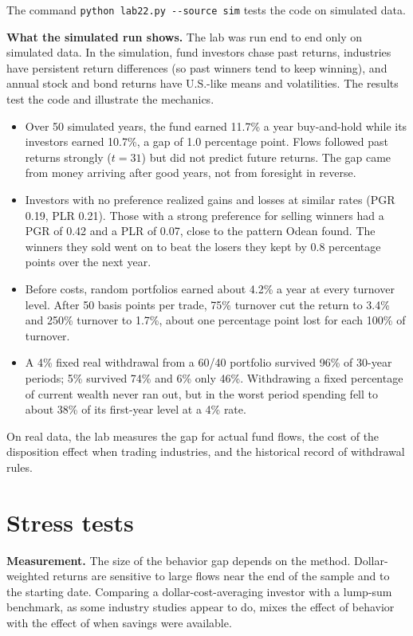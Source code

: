 The command \texttt{python lab22.py -{}-source sim} tests the code on simulated data.

\textbf{What the simulated run shows.} The lab was run end to end only on simulated data. In the simulation, fund investors chase past returns, industries have persistent return differences (so past winners tend to keep winning), and annual stock and bond returns have U.S.-like means and volatilities. The results test the code and illustrate the mechanics.

\begin{itemize}
  \item Over 50 simulated years, the fund earned 11.7\% a year buy-and-hold while its investors earned 10.7\%, a gap of 1.0 percentage point. Flows followed past returns strongly ($t = 31$) but did not predict future returns. The gap came from money arriving after good years, not from foresight in reverse.
  \item Investors with no preference realized gains and losses at similar rates (PGR 0.19, PLR 0.21). Those with a strong preference for selling winners had a PGR of 0.42 and a PLR of 0.07, close to the pattern Odean found. The winners they sold went on to beat the losers they kept by 0.8 percentage points over the next year.
  \item Before costs, random portfolios earned about 4.2\% a year at every turnover level. After 50 basis points per trade, 75\% turnover cut the return to 3.4\% and 250\% turnover to 1.7\%, about one percentage point lost for each 100\% of turnover.
  \item A 4\% fixed real withdrawal from a 60/40 portfolio survived 96\% of 30-year periods; 5\% survived 74\% and 6\% only 46\%. Withdrawing a fixed percentage of current wealth never ran out, but in the worst period spending fell to about 38\% of its first-year level at a 4\% rate.
\end{itemize}

On real data, the lab measures the gap for actual fund flows, the cost of the disposition effect when trading industries, and the historical record of withdrawal rules.

\section{Stress tests}
\label{sec:24-stress}

\textbf{Measurement.} The size of the behavior gap depends on the method. Dollar-weighted returns are sensitive to large flows near the end of the sample and to the starting date. Comparing a dollar-cost-averaging investor with a lump-sum benchmark, as some industry studies appear to do, mixes the effect of behavior with the effect of when savings were available.

